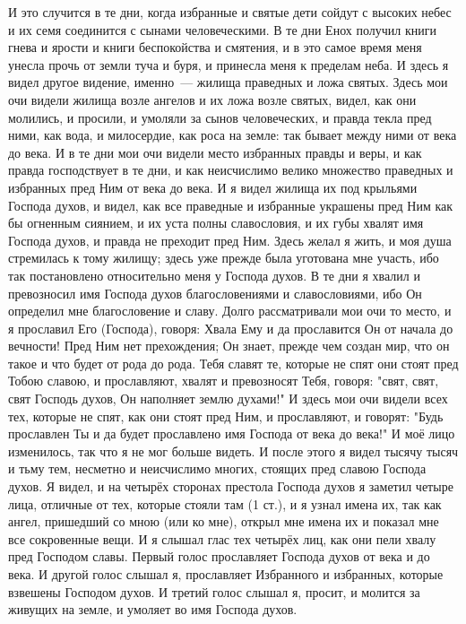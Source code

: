 И это случится в те дни, когда избранные и святые дети сойдут с
высоких небес и их семя соединится с сынами человеческими.
В те дни Енох получил книги гнева и ярости и книги беспокойства и
смятения, и в это самое время меня унесла прочь от земли туча и буря, и
принесла меня к пределам неба.
И здесь я видел другое видение, именно~--- жилища праведных и ложа
святых.
Здесь мои очи видели жилища возле ангелов и их ложа возле святых,
видел, как они молились, и просили, и умоляли за сынов человеческих, и правда
текла пред ними, как вода, и милосердие, как роса на земле: так бывает между
ними от века до века.
И в те дни мои очи видели место избранных правды и веры, и как правда
господствует в те дни, и как неисчислимо велико множество праведных и избранных
пред Ним от века до века.
И я видел жилища их под крыльями Господа духов, и видел, как все
праведные и избранные украшены пред Ним как бы огненным сиянием, и их уста
полны славословия, и их губы хвалят имя Господа духов, и правда не преходит
пред Ним.
Здесь желал я жить, и моя душа стремилась к тому жилищу; здесь уже
прежде была уготована мне участь, ибо так постановлено относительно меня у
Господа духов.
В те дни я хвалил и превозносил имя Господа духов благословениями и
славословиями, ибо Он определил мне благословение и славу.
Долго рассматривали мои очи то место, и я прославил Его (Господа),
говоря: Хвала Ему и да прославится Он от начала до вечности!
Пред Ним нет прехождения; Он знает, прежде чем создан мир, что он
такое и что будет от рода до рода.
Тебя славят те, которые не спят они стоят пред Тобою славою, и
прославляют, хвалят и превозносят Тебя, говоря: "свят, свят, свят
Господь духов, Он наполняет землю духами!"
И здесь мои очи видели всех тех, которые не спят, как они стоят пред
Ним, и прославляют, и говорят: "Будь прославлен Ты и да будет прославлено имя
Господа от века до века!"
И моё лицо изменилось, так что я не мог больше видеть.
И после этого я видел тысячу тысяч и тьму тем, несметно и
неисчислимо многих, стоящих пред славою Господа духов.
Я видел, и на четырёх сторонах престола Господа духов я заметил
четыре лица, отличные от тех, которые стояли там (1 ст.), и я узнал имена их,
так как ангел, пришедший со мною (или ко мне), открыл мне имена их и показал
мне все сокровенные вещи.
И я слышал глас тех четырёх лиц, как они пели хвалу пред Господом
славы.
Первый голос прославляет Господа духов от века и до века.
И другой голос слышал я, прославляет Избранного и избранных, которые
взвешены Господом духов.
И третий голос слышал я, просит, и молится за живущих на земле, и
умоляет во имя Господа духов.
